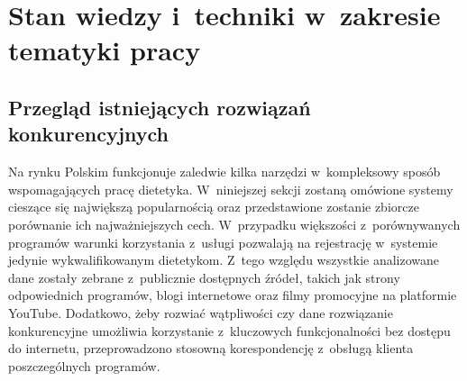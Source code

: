 \chapter{Stan wiedzy i~techniki w~zakresie tematyki pracy}\label{ch:knowladge-state}
\section{Przegląd istniejących rozwiązań konkurencyjnych}\label{sec:competitive-solutions}
Na rynku Polskim funkcjonuje zaledwie kilka narzędzi w~kompleksowy sposób wspomagających pracę dietetyka.
W~niniejszej sekcji zostaną omówione systemy cieszące się największą popularnością oraz przedstawione zostanie zbiorcze porównanie ich najważniejszych cech.
W~przypadku większości z~porównywanych programów warunki korzystania z~usługi pozwalają na rejestrację w~systemie jedynie wykwalifikowanym dietetykom.
Z~tego względu wszystkie analizowane dane zostały zebrane z~publicznie dostępnych źródeł,
takich jak strony odpowiednich programów, blogi internetowe oraz filmy promocyjne na platformie YouTube\cite{url:youtube}.
Dodatkowo, żeby rozwiać wątpliwości czy dane rozwiązanie konkurencyjne umożliwia korzystanie z~kluczowych funkcjonalności bez dostępu do internetu, przeprowadzono stosowną korespondencję z~obsługą klienta poszczególnych programów.
